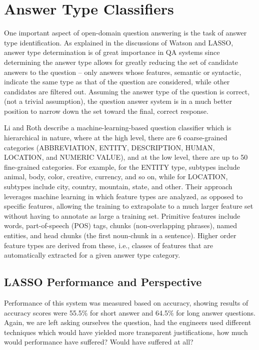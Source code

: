 \section{Answer Type Classifiers}

One important aspect of open-domain question answering is the task of answer type identification.  As explained in the discussions of Watson and LASSO, answer type determination is of great importance in QA systems since determining the answer type allows for greatly reducing the set of candidate answers to the question – only answers whose features, semantic or syntactic, indicate the same type as that of the question are considered, while other candidates are filtered out.  Assuming the answer type of the question is correct, (not a trivial assumption), the question answer system is in a much better position to narrow down the set toward the final, correct response.

Li and Roth \cite{li2002learning} describe a machine-learning-based question classifier which is hierarchical in nature, where at the high level, there are 6 coarse-grained categories (ABBREVIATION, ENTITY, DESCRIPTION, HUMAN, LOCATION, and NUMERIC VALUE), and at the low level, there are up to 50 fine-grained categories.  For example, for the ENTITY type, subtypes include animal, body, color, creative, currency, and so on, while for LOCATION, subtypes include city, country, mountain, state, and other.  Their approach leverages machine learning in which feature types are analyzed, as opposed to specific features, allowing the training to extrapolate to a much larger feature set without having to annotate as large a training set.  Primitive features include words, part-of-speech (POS) tags, chunks (non-overlapping phrases),  named entities, and head chunks (the first noun-chunk in a sentence).   Higher order feature types are derived from these, i.e., classes of features that are automatically extracted for a given answer type category. 

\subsection{LASSO Performance and Perspective}

Performance of this system was measured based on accuracy, showing results of accuracy scores were 55.5\% for short answer and 64.5\% for long answer questions.  Again, we are left asking ourselves the question, had the engineers used different techniques which would have yielded more transparent justifications, how much would performance have suffered?  Would have suffered at all? 

